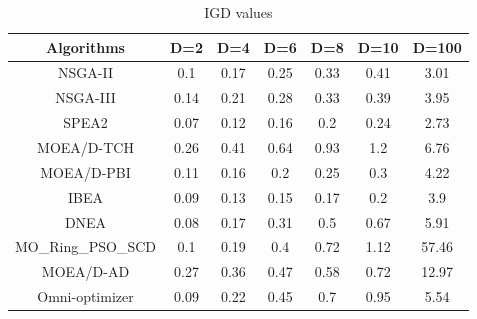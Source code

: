 \documentclass[conference]{IEEEtran}
\begin{document}
\begin{table}[htbp]
\centering
\caption{IGD values}
\begin{tabular}{@{}ccccccc@{}}
\toprule
Algorithms      & D=2                          & D=4                          & D=6                          & D=8                          & D=10                        & D=100                        \\ \midrule
NSGA-II         & 0.1                          & 0.17                         & 0.25                         & 0.33                         & 0.41                        & 3.01                         \\
NSGA-III        & 0.14                         & 0.21                         & 0.28                         & 0.33                         & 0.39                        & 3.95                         \\
SPEA2           & \cellcolor[HTML]{F8FF00}0.07 & \cellcolor[HTML]{F8FF00}0.12 & 0.16                         & 0.2                          & 0.24                        & \cellcolor[HTML]{F8FF00}2.73 \\
MOEA/D-TCH      & 0.26                         & 0.41                         & 0.64                         & 0.93                         & 1.2                         & 6.76                         \\
MOEA/D-PBI      & 0.11                         & 0.16                         & 0.2                          & 0.25                         & 0.3                         & 4.22                         \\
IBEA            & 0.09                         & 0.13                         & \cellcolor[HTML]{F8FF00}0.15 & \cellcolor[HTML]{F8FF00}0.17 & \cellcolor[HTML]{F8FF00}0.2 & 3.9                          \\
DNEA            & 0.08                         & 0.17                         & 0.31                         & 0.5                          & 0.67                        & 5.91                         \\
MO\_Ring\_PSO\_SCD & 0.1                          & 0.19                         & 0.4                          & 0.72                         & 1.12                        & 57.46                        \\
MOEA/D-AD       & 0.27                         & 0.36                         & 0.47                         & 0.58                         & 0.72                        & 12.97                        \\
Omni-optimizer  & 0.09                         & 0.22                         & 0.45                         & 0.7                          & 0.95                        & 5.54                         \\ \bottomrule
\end{tabular}
\label{table: IGD sumup}
\end{table}
\end{document}
